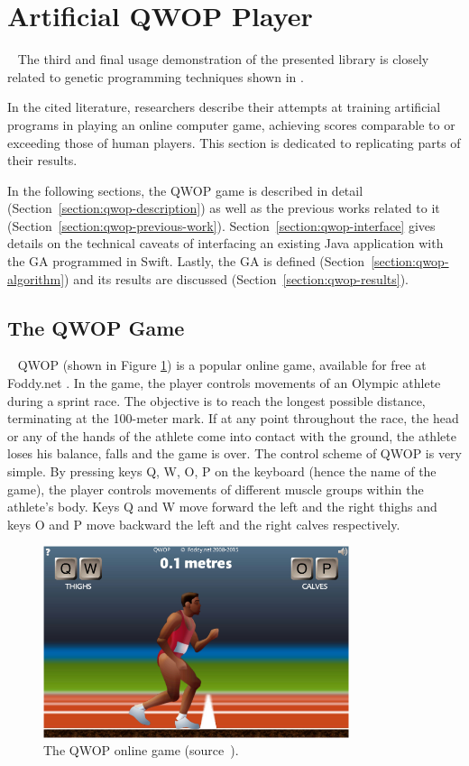 \section{Artificial QWOP Player}~\label{section:qwop-player}
The third and final usage demonstration of the presented library is closely related to genetic programming techniques shown in \cite{EvolvingQwopGaits}.

In the cited literature, researchers describe their attempts at training artificial programs in playing an online computer game, achieving scores comparable to or exceeding those of human players. This section is dedicated to replicating parts of their results.

In the following sections, the QWOP game is described in detail (Section~\ref{section:qwop-description}) as well as the previous works related to it (Section~\ref{section:qwop-previous-work}). Section~\ref{section:qwop-interface} gives details on the technical caveats of interfacing an existing Java application with the GA programmed in Swift. Lastly, the GA is defined (Section~\ref{section:qwop-algorithm}) and its results are discussed (Section~\ref{section:qwop-results}).

\subsection{The QWOP Game}~\label{section:qwop-description}
QWOP (shown in Figure \ref{figure:QWOP}) is a popular online game, available for free at Foddy.net \cite{QwopWebsite}. In the game, the player controls movements of an Olympic athlete during a sprint race. The objective is to reach the longest possible distance, terminating at the 100-meter mark. If at any point throughout the race, the head or any of the hands of the athlete come into contact with the ground, the athlete loses his balance, falls and the game is over. The control scheme of QWOP is very simple. By pressing keys Q, W, O, P on the keyboard (hence the name of the game), the player controls movements of different muscle groups within the athlete's body. Keys Q and W move forward the left and the right thighs and keys O and P move backward the left and the right calves respectively.

\begin{figure}[ht]
	\centering
	\includegraphics[width=0.8\textwidth]{img/qwop.png}
	\caption[The QWOP online game.]{The QWOP online game (source~\cite{QwopWebsite}).}
	\label{figure:QWOP}
\end{figure}

